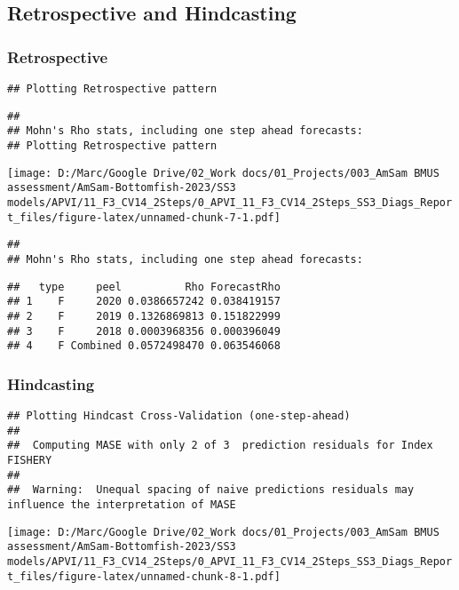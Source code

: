 \documentclass[
]{article}
\begin{document}
\hypertarget{retrospective-and-hindcasting}{%
\subsection{Retrospective and
Hindcasting}\label{retrospective-and-hindcasting}}

\hypertarget{retrospective}{%
\subsubsection{Retrospective}\label{retrospective}}

\begin{verbatim}
## Plotting Retrospective pattern
\end{verbatim}

\begin{verbatim}
## 
## Mohn's Rho stats, including one step ahead forecasts:
## Plotting Retrospective pattern
\end{verbatim}

\texttt{[image: D:/Marc/Google Drive/02\_Work docs/01\_Projects/003\_AmSam BMUS assessment/AmSam-Bottomfish-2023/SS3 models/APVI/11\_F3\_CV14\_2Steps/0\_APVI\_11\_F3\_CV14\_2Steps\_SS3\_Diags\_Report\_files/figure-latex/unnamed-chunk-7-1.pdf]}

\begin{verbatim}
## 
## Mohn's Rho stats, including one step ahead forecasts:
\end{verbatim}

\begin{verbatim}
##   type     peel          Rho ForecastRho
## 1    F     2020 0.0386657242 0.038419157
## 2    F     2019 0.1326869813 0.151822999
## 3    F     2018 0.0003968356 0.000396049
## 4    F Combined 0.0572498470 0.063546068
\end{verbatim}

\hypertarget{hindcasting}{%
\subsubsection{Hindcasting}\label{hindcasting}}

\begin{verbatim}
## Plotting Hindcast Cross-Validation (one-step-ahead) 
## 
##  Computing MASE with only 2 of 3  prediction residuals for Index FISHERY 
## 
##  Warning:  Unequal spacing of naive predictions residuals may influence the interpretation of MASE
\end{verbatim}

\texttt{[image: D:/Marc/Google Drive/02\_Work docs/01\_Projects/003\_AmSam BMUS assessment/AmSam-Bottomfish-2023/SS3 models/APVI/11\_F3\_CV14\_2Steps/0\_APVI\_11\_F3\_CV14\_2Steps\_SS3\_Diags\_Report\_files/figure-latex/unnamed-chunk-8-1.pdf]}
\end{document}
